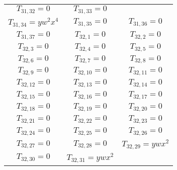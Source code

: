 \documentclass[12pt]{memoireuqam1.3}
\begin{document}
\begin{longtable}{|c|c|c|}
$T_{31,32}= 0$&

$T_{31,33}= 0$\\

$T_{31,34}= yw^2x^4$&

$T_{31,35}= 0$&

$T_{31,36}= 0$\\

$T_{31,37}= 0$&

$T_{32,1}= 0$&

$T_{32,2}= 0$\\

$T_{32,3}= 0$&

$T_{32,4}= 0$&

$T_{32,5}= 0$\\

$T_{32,6}= 0$&

$T_{32,7}= 0$&

$T_{32,8}= 0$\\

$T_{32,9}= 0$&

$T_{32,10}= 0$&

$T_{32,11}= 0$\\

$T_{32,12}= 0$&

$T_{32,13}= 0$&

$T_{32,14}= 0$\\

$T_{32,15}= 0$&

$T_{32,16}= 0$&

$T_{32,17}= 0$\\

$T_{32,18}= 0$&

$T_{32,19}= 0$&

$T_{32,20}= 0$\\

$T_{32,21}= 0$&

$T_{32,22}= 0$&

$T_{32,23}= 0$\\

$T_{32,24}= 0$&

$T_{32,25}= 0$&

$T_{32,26}= 0$\\

$T_{32,27}= 0$&

$T_{32,28}= 0$&

$T_{32,29}= ywx^2$\\

$T_{32,30}= 0$&

$T_{32,31}= ywx^2$&


\end{longtable}
\end{document}
